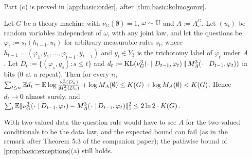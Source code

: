 Part (c) is proved in \cref{app:basic:order}, after \cref{thm:basic:kolmogorov}.

\begin{theorem}\label{thm:basic:merging}
Let $G$ be a theory machine with $\nu_G(\emptyset)=1$, $\omega\sim\mathbb{U}$ and $A:=A^G_\omega$. Let $(u_t)$ be random variables independent of $\omega$, with any joint law, and let the questions be $\varphi_t:=s_t(h_{t-1},u_t)$ for arbitrary measurable rules $s_t$, where $h_{t-1}=(\varphi_1,y_1,\dots,\varphi_{t-1},y_{t-1})$ and $y_t\in Y_3$ is the trichotomy label of $\varphi_t$ under $A$. Let $D_t:=\{(\varphi_s,y_s):s\le t\}$ and $d_t:=\operatorname{KL}(\nu^3_G(\cdot\mid D_{t-1},\varphi_t)\,\|\,M_{A}^{3}(\cdot\mid D_{t-1},\varphi_t))$ in bits ($0$ at a repeat). Then for every $n$, $\sum_{t\le n}\mathbb{E} d_t=\mathbb{E}\log\frac{\nu^3_G(D_n)}{M_{A}^{3}(D_n)}+\log M_{A}(\emptyset)\le K(G)+\log M_{A}(\emptyset)<K(G)$. Hence $d_t\to0$ almost surely, and $\sum_t\mathbb{E}\lVert\nu^3_G(\cdot\mid D_{t-1},\varphi_t)-M_{A}^{3}(\cdot\mid D_{t-1},\varphi_t)\rVert_1^2\le2\ln2\cdot K(G)$.
\end{theorem}

With two-valued data the question rule would have to see $A$ for the two-valued conditionals to be the data law, and the expected bound can fail (as in the remark after Theorem 5.3 of the companion paper); the pathwise bound of \cref{prop:basic:exceptions}(a) still holds.

